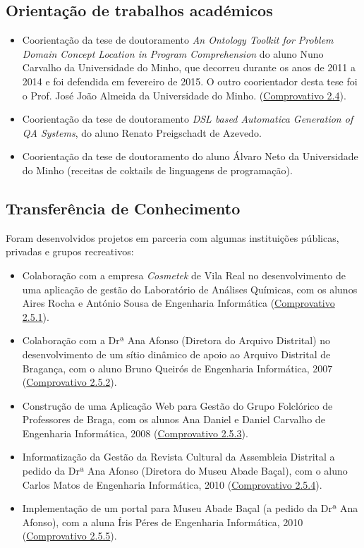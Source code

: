 \documentclass[11pt]{article}
\begin{document}
\subsection{Orientação de trabalhos académicos}
\begin{itemize}
\item {Coorientação da tese de doutoramento \emph{An Ontology Toolkit for Problem Domain Concept Location in Program Comprehension} do aluno Nuno Carvalho da Universidade do Minho, que decorreu durante os anos de 2011 a 2014 e foi defendida em fevereiro de 2015. O outro coorientador desta tese foi o Prof. José João Almeida da Universidade do Minho. (\href{run:CoOrientDout/DecMJVarndaMAPi.pdf}{Comprovativo 2.4}).}
\item {Coorientação da tese de doutoramento \emph{DSL based Automatica Generation of QA Systems}, do aluno Renato Preigschadt de Azevedo.}
\item {Coorientação da tese de doutoramento do aluno Álvaro Neto da Universidade do Minho (receitas de coktails de linguagens de programação).}
\end{itemize}

\subsection{Transferência de Conhecimento}
Foram desenvolvidos projetos em parceria com algumas instituições públicas, privadas e grupos recreativos:
\begin{itemize}
\item {Colaboração com a empresa {\em{ Cosmetek}} de Vila Real no desenvolvimento de uma aplicação de gestão do Laboratório de Análises Químicas, com os alunos Aires Rocha e António Sousa de Engenharia Informática (\href{run:CoOrientTrabalhos/emdesenvolvimento/cosmetek.pdf}{Comprovativo 2.5.1}).}
\item {Colaboração com a Drª Ana Afonso (Diretora do Arquivo Distrital) no desenvolvimento de um sítio dinâmico de apoio ao Arquivo Distrital de Bragança, com o aluno Bruno Queirós de Engenharia Informática, 2007 (\href{run:CoOrientTrabalhos/projFimCursoEI.pdf}{Comprovativo 2.5.2}).}
\item {Construção de uma Aplicação Web para Gestão do Grupo Folclórico de Professores de Braga, com os alunos Ana Daniel e Daniel Carvalho de Engenharia Informática, 2008 (\href{run:CoOrientTrabalhos/projFimCursoEI.pdf}{Comprovativo 2.5.3}).}
\item {Informatização da Gestão da Revista Cultural da Assembleia Distrital a pedido da Drª Ana Afonso (Diretora do Museu Abade Baçal), com o aluno Carlos Matos de Engenharia Informática, 2010 (\href{run:CoOrientTrabalhos/projFimCursoEI.pdf}{Comprovativo 2.5.4}).}
\item {Implementação de um portal para  Museu Abade Baçal (a pedido da Drª Ana Afonso), com a aluna Íris Péres de Engenharia Informática, 2010 (\href{run:CoOrientTrabalhos/projFimCursoEI.pdf}{Comprovativo 2.5.5}).}
\end{itemize}
\end{document}

